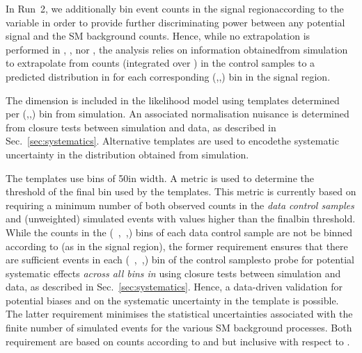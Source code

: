 In Run~2, we additionally bin event counts in the signal regionaccording to the variable \mht in order to provide further
discriminating power between any potential signal and the SM background counts. Hence, while no extrapolation is performed in
\njet, \nb, nor \HT, the analysis relies on information obtainedfrom simulation to extrapolate from counts (integrated over \mht) in
the control samples to a predicted distribution in \mht for each corresponding (\njet,\nb,\HT) bin in the signal region.

The \mht dimension is included in the likelihood model using templates determined per (\njet,\nb,\HT) bin from simulation. An associated
normalisation nuisance is determined from closure tests between simulation and data, as described in
Sec.~\ref{sec:systematics}. Alternative templates are used to encodethe systematic uncertainty in the \mht distribution obtained from
simulation. 

The templates use \mht bins of 50\gev in width. A metric is used to determine the threshold of the final \mht bin used by the
templates. This metric is currently based on requiring a minimum number of both observed counts in the {\it data control samples} and
(unweighted) simulated events with \mht values higher than the finalbin threshold. While the counts in the (\njet~,\nb~,\HT) bins of each
data control sample are not be binned according to \mht (as in the signal region), the former requirement ensures that there are
sufficient events in each (\njet~,\nb~,\HT) bin of the control samplesto probe for potential systematic effects {\it across all bins in
  \mht} using closure tests between simulation and data, as described in Sec.~\ref{sec:systematics}. Hence, a data-driven validation for
potential biases and on the systematic uncertainty in the \mht template is possible. The latter requirement minimises the statistical
uncertainties associated with the finite number of simulated events for the various SM background processes. Both requirement are based on
counts according to \njet and \nb but inclusive with respect to \nb.
